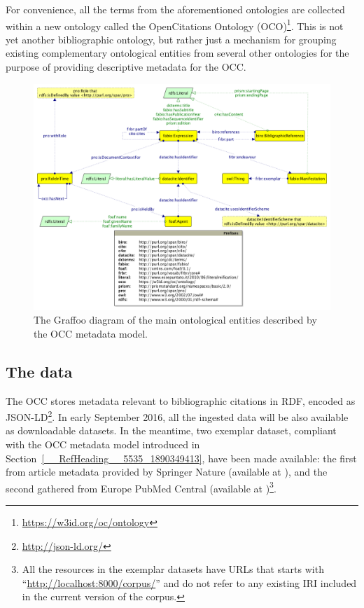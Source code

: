 \documentclass[runningheads,a4paper]{llncs}
\makeatletter
\def\maxwidth#1{\ifdim\Gin@nat@width>#1 #1\else\Gin@nat@width\fi}
\makeatother
\begin{document}
For convenience, all the terms from the aforementioned ontologies are collected within a new ontology called the OpenCitations Ontology (OCO)\footnote{\url{https://w3id.org/oc/ontology}}. This is not yet another bibliographic ontology, but rather just a mechanism for grouping existing complementary ontological entities from several other ontologies for the purpose of providing descriptive metadata for the OCC.
\begin{figure}[h!]
\centering
\includegraphics[width=\maxwidth{\textwidth}]{img/10000000000004F1000003C40B1D2514.png}
\cprotect\caption{The Graffoo diagram  \cite{__RefNumPara__6706_524287244} of the main ontological entities described by the OCC metadata model.}
\label{refIllustration2}
\end{figure}


\subsection{The data}\label{__RefHeading__10638_1890349413}

The OCC stores metadata relevant to bibliographic citations in RDF, encoded as JSON-LD\footnote{\url{http://json-ld.org/}}. In early September 2016, all the ingested data will be also available as downloadable datasets. In the meantime, two exemplar dataset, compliant with the OCC metadata model introduced in Section~\ref{__RefHeading__5535_1890349413}, have been made available: the first from article metadata provided by Springer Nature (available at  \cite{__RefNumPara__5447_1890349413}), and the second gathered from Europe PubMed Central (available at  \cite{__RefNumPara__5449_1890349413})\footnote{All the resources in the exemplar datasets have URLs that starts with ``\url{http://localhost:8000/corpus/}'' and do not refer to any existing IRI included in the current version of the corpus.}. 
\end{document}
